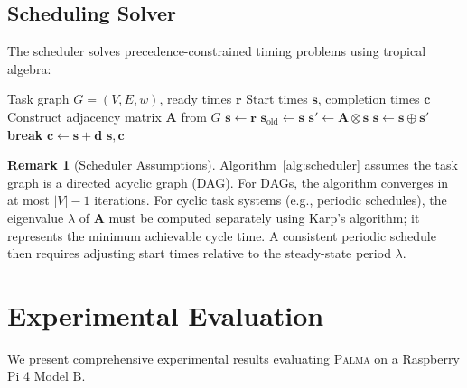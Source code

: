 \documentclass[11pt,a4paper]{article}
\theoremstyle{plain}
\theoremstyle{definition}
\newtheorem{remark}[theorem]{Remark}
\newcommand{\palma}{\textsc{Palma}}
\newcommand{\mat}[1]{\mathbf{#1}}
\newcommand{\vect}[1]{\mathbf{#1}}
\begin{document}
\subsection{Scheduling Solver}

The scheduler solves precedence-constrained timing problems using tropical algebra:

\begin{algorithm}[htbp]
\caption{Precedence-Constrained Scheduling}
\label{alg:scheduler}
\begin{algorithmic}[1]
\Require Task graph $G = (V, E, w)$, ready times $\vect{r}$
\Ensure Start times $\vect{s}$, completion times $\vect{c}$
\State Construct adjacency matrix $\mat{A}$ from $G$
\State $\vect{s} \leftarrow \vect{r}$ 
    \State $\vect{s}_{\text{old}} \leftarrow \vect{s}$ 
    \State $\vect{s}' \leftarrow \mat{A} \otimes \vect{s}$ 
    \State $\vect{s} \leftarrow \vect{s} \oplus \vect{s}'$ 
    \If{$\vect{s} = \vect{s}_{\text{old}}$} \textbf{break} 
    \EndIf
\EndFor
\State $\vect{c} \leftarrow \vect{s} + \vect{d}$ 
\State \Return $\vect{s}, \vect{c}$
\end{algorithmic}
\end{algorithm}

\begin{remark}[Scheduler Assumptions]
Algorithm~\ref{alg:scheduler} assumes the task graph is a directed acyclic graph (DAG). For DAGs, the algorithm converges in at most $|V|-1$ iterations. For cyclic task systems (e.g., periodic schedules), the eigenvalue $\lambda$ of $\mat{A}$ must be computed separately using Karp's algorithm; it represents the minimum achievable cycle time. A consistent periodic schedule then requires adjusting start times relative to the steady-state period $\lambda$.
\end{remark}

\section{Experimental Evaluation}
\label{sec:experiments}

We present comprehensive experimental results evaluating \palma{} on a Raspberry Pi 4 Model B.
\end{document}
